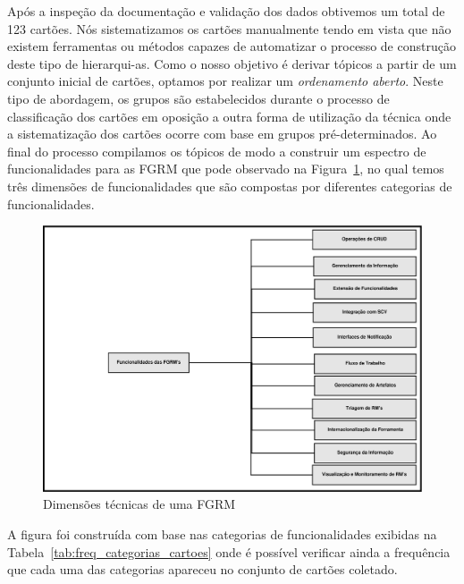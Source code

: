 Após a inspeção da documentação e validação dos dados obtivemos um total de 123
cartões. Nós sistematizamos os cartões manualmente tendo em vista que não
existem ferramentas ou métodos capazes de automatizar o processo de construção
deste tipo de hi\-e\-rar\-qui-\-as. Como o nosso objetivo é derivar tópicos a
partir de um conjunto inicial de cartões, optamos por realizar um
\textit{ordenamento aberto}. Neste tipo de abordagem, os grupos são
estabelecidos durante o processo de classificação dos cartões em oposição a
outra forma de utilização da técnica onde a sistematização dos cartões ocorre
com base em grupos pré-determinados. Ao final do processo compilamos os tópicos
de modo a construir um espectro de funcionalidades para as FGRM que pode
observado na Figura~\ref{fig:diagrama-espectro-funcionalidades-fgrm}, no qual
temos três dimensões de funcionalidades que são compostas por diferentes
categorias de funcionalidades.

\begin{figure}[htpb]
	\centering
	\includegraphics[width=1.15\linewidth]{./chapter-estudo-funcionalidades-fgrm/img/diagrama-espectro-funcionalidades-fgrm.pdf}
	\caption{Dimensões técnicas de uma FGRM}
\label{fig:diagrama-espectro-funcionalidades-fgrm}
\end{figure}

A figura foi construída com base nas categorias de funcionalidades exibidas na
Tabela~\ref{tab:freq_categorias_cartoes} onde é possível verificar ainda a
frequência que cada uma das categorias apareceu no conjunto de cartões
coletado.

